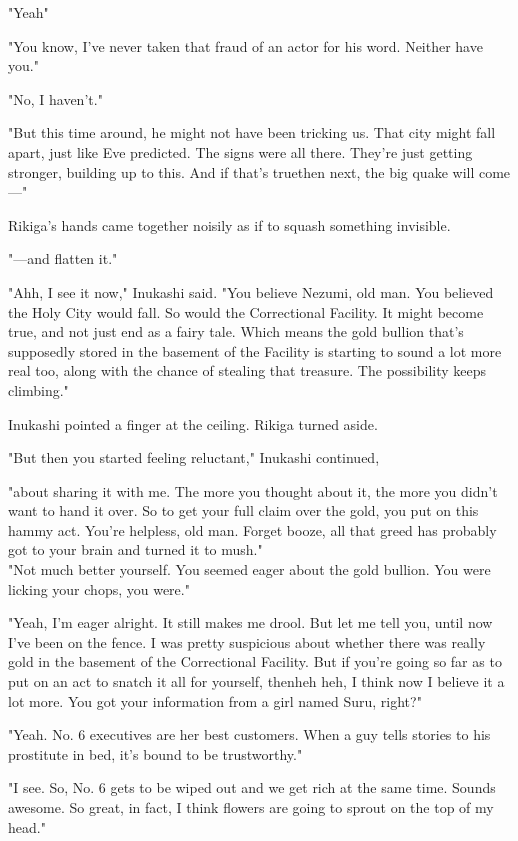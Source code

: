 "Yeah\el "

"You know, I've never taken that fraud of an actor for his word. Neither
have you."

"No, I haven't."

"But this time around, he might not have been tricking us. That city
might fall apart, just like Eve predicted. The signs were all there.
They're just getting stronger, building up to this. And if that's
true\el then next, the big quake will come---"

Rikiga's hands came together noisily as if to squash something
invisible.

"---and flatten it."

"Ahh, I see it now," Inukashi said. "You believe Nezumi, old man. You
believed the Holy City would fall. So would the Correctional Facility.
It might become true, and not just end as a fairy tale. Which means the
gold bullion that's supposedly stored in the basement of the Facility is
starting to sound a lot more real too, along with the chance of stealing
that treasure. The possibility keeps climbing."

Inukashi pointed a finger at the ceiling. Rikiga turned aside.

"But then you started feeling reluctant," Inukashi continued,~

"about sharing it with me. The more you thought about it, the more you
didn't want to hand it over. So to get your full claim over the gold,
you put on this hammy act. You're helpless, old man. Forget booze, all
that greed has probably got to your brain and turned it to mush."\\

"Not much better yourself. You seemed eager about the gold bullion. You
were licking your chops, you were."

"Yeah, I'm eager alright. It still makes me drool. But let me tell you,
until now I've been on the fence. I was pretty suspicious about whether
there was really gold in the basement of the Correctional Facility. But
if you're going so far as to put on an act to snatch it all for
yourself, then\el heh heh, I think now I believe it a lot more. You got
your information from a girl named Suru, right?"

"Yeah. No. 6 executives are her best customers. When a guy tells stories
to his prostitute in bed, it's bound to be trustworthy."

"I see. So, No. 6 gets to be wiped out and we get rich at the same time.
Sounds awesome. So great, in fact, I think flowers are going to sprout
on the top of my head."


